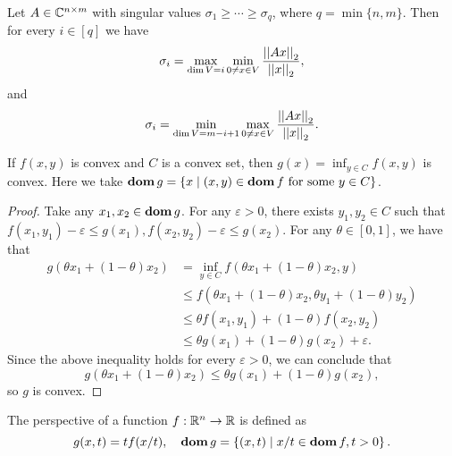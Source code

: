 \documentclass[12pt]{article}
\begin{document}
\begin{theorem}
    Let \(A\in\mathbb C^{n\times m}\) with singular values \(\sigma_1\geqslant\cdots\geqslant\sigma_q\), where \(q=\min\{n,m\}\). Then for every \(i\in[q]\) we have
    \[\sigma_i=\max_{\dim V=i}\min_{0\neq x\in V}\frac{\left|\left|Ax\right|\right|_2}{\left|\left|x\right|\right|_2},\]
    and
    \[\sigma_i=\min_{\dim V=m-i+1}\max_{0\neq x\in V}\frac{\left|\left|Ax\right|\right|_2}{\left|\left|x\right|\right|_2}.\]
\end{theorem}

\begin{theorem}
    If \(f(x,y)\) is convex and \(C\) is a convex set, then \(g(x)=\inf_{y\in C}f(x,y)\) is convex. Here we take \(\operatorname{\mathbf{dom}} g=\left\{x\mid (x,y)\in\operatorname{\mathbf{dom}} f\textnormal{ for some }y\in C\right\}\).
\end{theorem}
\begin{proof}
    Take any \(x_1,x_2\in\operatorname{\mathbf{dom}} g\). For any \(\varepsilon>0\), there exists \(y_1,y_2\in C\) such that \(f(x_1,y_1)-\varepsilon\leqslant g(x_1),f(x_2,y_2)-\varepsilon\leqslant g(x_2)\). For any \(\theta\in[0,1]\), we have that
    \[\begin{aligned}
        g(\theta x_1+(1-\theta)x_2)
        &= \inf_{y\in C}f\left(\theta x_1+(1-\theta)x_2, y\right)\\
        &\leqslant f\left(\theta x_1+(1-\theta)x_2,\theta y_1+(1-\theta)y_2\right)\\
        &\leqslant \theta f(x_1,y_1)+(1-\theta)f(x_2,y_2)\\
        &\leqslant \theta g(x_1)+(1-\theta)g(x_2)+\varepsilon.
    \end{aligned}\]
    Since the above inequality holds for every \(\varepsilon>0\), we can conclude that
    \[g\left(\theta x_1+(1-\theta)x_2\right)\leqslant\theta g(x_1)+(1-\theta)g(x_2),\]
    so \(g\) is convex.
\end{proof}

\begin{definition}[Perspective]
    The \textnormal{perspective} of a function \(f:\mathbb R^n\to\mathbb R\) is defined as
    \[g(x,t)=tf(x/t),\quad\operatorname{\mathbf{dom}} g=\left\{(x,t)\mid x/t\in\operatorname{\mathbf{dom}} f,t>0\right\}.\]
\end{definition}
\end{document}
